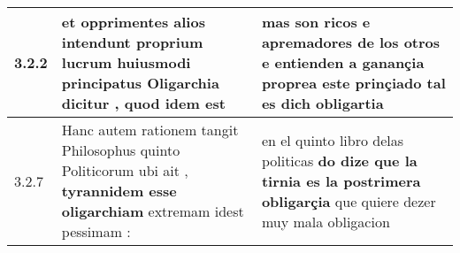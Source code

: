 \begin{tabular}{|p{1cm}|p{6.5cm}|p{6.5cm}|}

\hline
3.2.2 & et opprimentes alios \textbf{ intendunt proprium lucrum huiusmodi principatus Oligarchia dicitur , } quod idem est & mas son ricos e apremadores de los otros \textbf{ e entienden a ganançia proprea este prinçiado } tal es dich obligartia \\\hline
3.2.7 & Hanc autem rationem tangit Philosophus quinto Politicorum ubi ait , \textbf{ tyrannidem esse oligarchiam } extremam idest pessimam : & en el quinto libro delas politicas \textbf{ do dize que la tirnia es la postrimera obligarçia } que quiere dezer muy mala obligacion \\\hline

\end{tabular}
